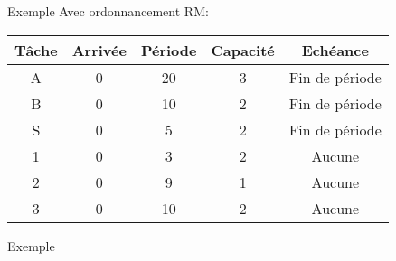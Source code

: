 \begin{frame}{Exemple}
  Avec ordonnancement RM:
  \begin{center}
    \begin{tabular}{ccccc}
      \hline
      Tâche & Arrivée & Période & Capacité & Echéance \\
      \hline
      A & 0 & 20 & 3 & Fin de période\\
      B & 0 & 10 & 2 & Fin de période\\
      S & 0 &  5 & 2 & Fin de période\\
      1 & 0 &  3 & 2 & Aucune\\
      2 & 0 &  9 & 1 & Aucune\\
      3 & 0 & 10 & 2 & Aucune\\
      \hline
    \end{tabular}
  \end{center}
\end{frame}
\begin{frame}{Exemple}
  
\end{frame} 


